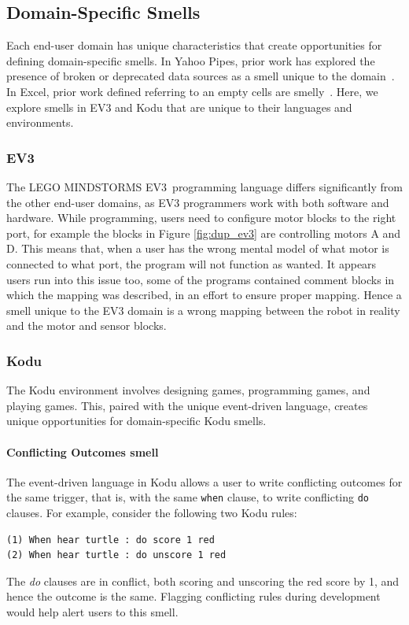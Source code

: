 \documentclass{sig-alternate}
\newcommand{\ms}{LEGO MINDSTORMS EV3}
\begin{document}
\subsection{Domain-Specific Smells}
Each end-user domain has unique characteristics that create opportunities for defining domain-specific smells. In Yahoo Pipes, prior work has explored the presence of broken or deprecated data sources as a smell unique to the domain~\cite{StoleeTSE2013}. In Excel, prior work defined referring to an empty cells are smelly~\cite{cunha2012towards}. Here, we explore smells in EV3 and Kodu that are unique to their languages and environments. 

\subsubsection{EV3}
The \ms~programming language differs significantly from the other end-user domains, as EV3 programmers work with both software and hardware. While programming, users need to configure motor blocks to the right port, for example the blocks in Figure \ref{fig:dup_ev3} are controlling motors A and D. This means that, when a user has the wrong mental model of what motor is connected to what port, the program will not function as wanted. It appears users run into this issue too, some of the programs contained comment blocks in which the mapping was described, in an effort to ensure proper mapping. Hence a smell unique to the EV3 domain is a wrong mapping between the robot in reality and the motor and sensor blocks. 

\subsubsection{Kodu}
The Kodu environment involves designing games, programming games, and playing games. This, paired with the unique event-driven language, creates unique opportunities for domain-specific Kodu smells. 

% 


\paragraph{Conflicting Outcomes smell}
The event-driven language in Kodu allows a user to write conflicting outcomes for the same trigger, that is, with the same \texttt{when} clause, to write conflicting \texttt{do} clauses. For example, consider the following two Kodu rules:
\begin{verbatim}
(1) When hear turtle : do score 1 red
(2) When hear turtle : do unscore 1 red
\end{verbatim}
\noindent The \emph{do} clauses are in conflict, both scoring and unscoring the red score by 1, and hence the outcome is the same. Flagging conflicting rules during development would help alert users to this smell. 
\end{document}
